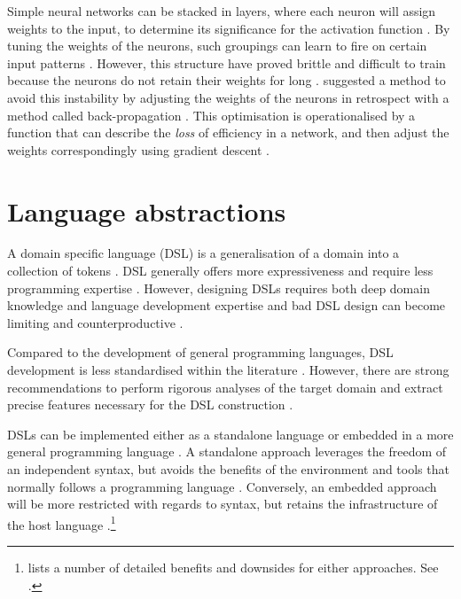 \documentclass[a4paper,oneside]{memoir}
\begin{document}
Simple neural networks can be stacked in layers, where each neuron will assign
weights to the input, to determine its significance for the activation function
\autocite{Nilsson2009}. By tuning the weights of the neurons, such groupings can
learn to fire on certain input patterns \autocite{russel2007}. However,
this structure have proved brittle and difficult to train because the
neurons do not retain their weights for long \autocite{Nilsson2009, russel2007}.
\autocite{Rumelhart1988} suggested a method to avoid this instability by adjusting
the weights of the neurons in retrospect with a method called back-propagation
\autocite{Rumelhart1988, Nilsson2009}. This optimisation is
operationalised by a function that can describe the \textit{loss} of efficiency
in a network, and then adjust the weights correspondingly using gradient
descent \autocite{russel2007}.

\section{Language abstractions}
A domain specific language (DSL) is a generalisation of a domain into a
collection of tokens \autocite{Mernik2005}. DSL generally offers more
expressiveness and require less programming expertise \autocite{Mernik2005, Sestoft2017}.
However, designing DSLs requires both deep domain knowledge and language
development expertise and bad DSL design can become limiting
and counterproductive \autocite{Mernik2005, Sestoft2017}.

Compared to the development of general programming languages, DSL development
is less standardised within the literature \autocite{Mernik2005, Deursen2002}.
However, there are strong recommendations to perform rigorous analyses of the
target domain and extract precise features necessary for the DSL construction
\autocite{Mernik2005, Deursen2002}.

DSLs can be implemented either as a standalone language or embedded in a more
general programming language \autocite{Mernik2005}. A standalone approach
leverages the freedom of an independent syntax, but avoids the benefits of
the environment and tools that normally follows a programming language
\autocite{Mernik2005, Sestoft2017}. Conversely, an embedded approach will be
more restricted with regards to syntax, but retains the infrastructure of the
host language \autocite{Mernik2005}.\footnote{\cite{Mernik2005} lists a
number of detailed benefits and downsides for either approaches. See
\autocite[330-331]{Mernik2005}.}
\end{document}
